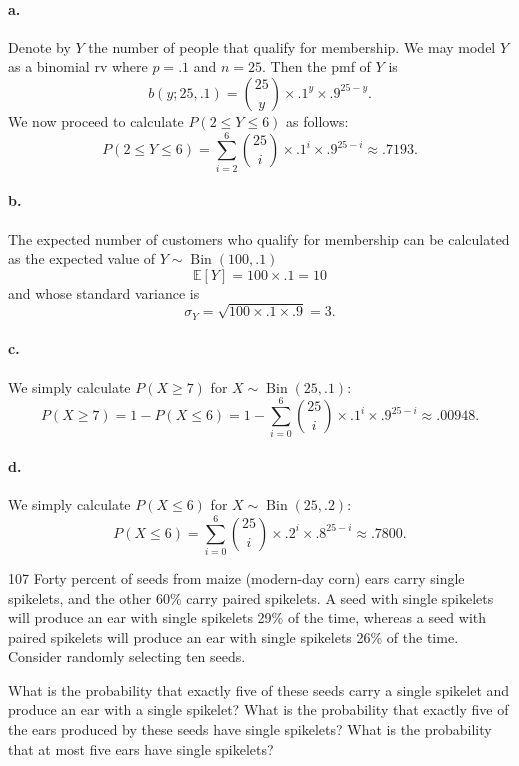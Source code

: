 \documentclass{exam}
\DeclareMathOperator{\Bin}{Bin}
\begin{document}
\paragraph{a.} Denote by $Y$ the number of people that qualify for membership. We may model $Y$ as a binomial rv where $p = .1$ and $n = 25$. Then the pmf of $Y$ is
\[
	b(y; 25, .1) = \binom{25}{y} \times .1^y \times .9^{25 - y}.
\]
We now proceed to calculate $P(2 \le Y \le 6)$ as follows:
\[
	P(2 \le Y \le 6) = \sum_{i = 2}^6 \binom{25}{i} \times .1^i \times .9^{25 - i} \approx .7193.
\]

\paragraph{b.}
The expected number of customers who qualify for membership can be calculated as the expected value of $Y \sim \Bin(100, .1)$
\[
	\mathbb E[Y] = 100 \times .1 = 10
\]
and whose standard variance is
\[
	\sigma_Y = \sqrt{100 \times .1 \times .9} = 3.
\]

\paragraph{c.}
We simply calculate $P(X \ge 7)$ for $X \sim \Bin(25, .1)$:
\[
	P(X \ge 7) = 1 - P(X \le 6) = 1 - \sum_{i = 0}^6 \binom{25}{i} \times .1^i \times .9^{25 - i} \approx .00948.
\]

\paragraph{d.}
We simply calculate $P(X \le 6)$ for $X \sim \Bin(25, .2)$:
\[
	P(X \le 6) = \sum_{i = 0}^6 \binom{25}{i} \times .2^i \times .8^{25 - i} \approx .7800.
\]

\begin{problem}{107}
	Forty percent of seeds from maize (modern-day corn) ears carry single spikelets, and the other 60\% carry paired spikelets. A seed with single spikelets will produce an ear with single spikelets 29\% of the time, whereas a seed with paired spikelets will produce an ear with single spikelets 26\% of the time. Consider randomly selecting ten seeds.
	\begin{tasks}[label=\textbf{\alph*.}]
		\task What is the probability that exactly five of these seeds carry a single spikelet and produce an ear with a single spikelet?
		\task What is the probability that exactly five of the ears produced by these seeds have single spikelets? What is the probability that at most five ears have single spikelets?
	\end{tasks}
\end{problem}
\end{document}

